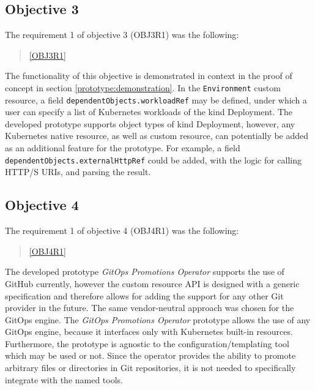 \subsection*{Objective 3}

The requirement 1 of objective 3 (OBJ3R1) was the following:

\begin{quotation}
	\noindent
	\ref{OBJ3R1}
\end{quotation}

The functionality of this objective is demonstrated in context in the proof of concept
in section \ref{prototype:demonstration}.
In the \lstinline|Environment| custom resource,
a field
\lstinline|dependentObjects.workloadRef| may be defined, under which a user can specify
a list of Kubernetes workloads of the kind Deployment.
The developed prototype supports object types of kind Deployment,
however, any Kubernetes native resource, as well as custom resource, can potentially be added as an
additional feature for the prototype.
For example, a field \lstinline|dependentObjects.externalHttpRef| could be added,
with the logic for calling HTTP/S URIs, and parsing the result.

\subsection*{Objective 4}

The requirement 1 of objective 4 (OBJ4R1) was the following:

\begin{quotation}
	\noindent
	\ref{OBJ4R1}
\end{quotation}

The developed prototype \textit{GitOps Promotions Operator} supports the use of GitHub currently,
however the custom resource API is designed with a generic specification and therefore allows
for adding the support for any other Git provider in the future.
The same vendor-neutral approach was chosen for the GitOps engine.
The \textit{GitOps Promotions Operator} prototype allows the use of any GitOps engine,
because it interfaces only with Kubernetes built-in resources.
Furthermore, the prototype is agnostic to the configuration/templating tool which may be used or not.
Since the operator provides the ability
to promote arbitrary files or directories in Git repositories, it is not needed to specifically integrate
with the named tools.






